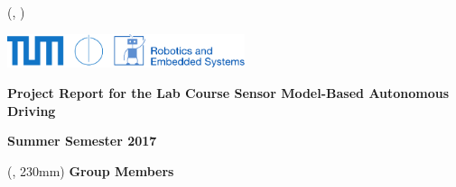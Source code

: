 \pagestyle{empty}

\begin{textblock*}{\textwidth}(\LeftMargin, \TopMargin)
    \raggedright\includegraphics[height=10mm]{./res/TUM.pdf}
\end{textblock*}


\vspace*{\TopMargin}

{\fontsize{24pt}{26pt}\selectfont\textbf{\ReportTitle}}
\vspace*{24pt}    

{\fontsize{18pt}{27pt}\selectfont\textbf{Project Report for the Lab Course Sensor Model-Based Autonomous Driving}}

{\fontsize{12pt}{27pt}\selectfont\textbf{Summer Semester 2017}}
    
\begin{textblock*}{\textwidth}(\LeftMargin, 230mm)
    {\fontsize{12pt}{14pt}\selectfont\textbf{Group Members}\\[8pt] \ReportAuthor}
\end{textblock*}

\newpage
